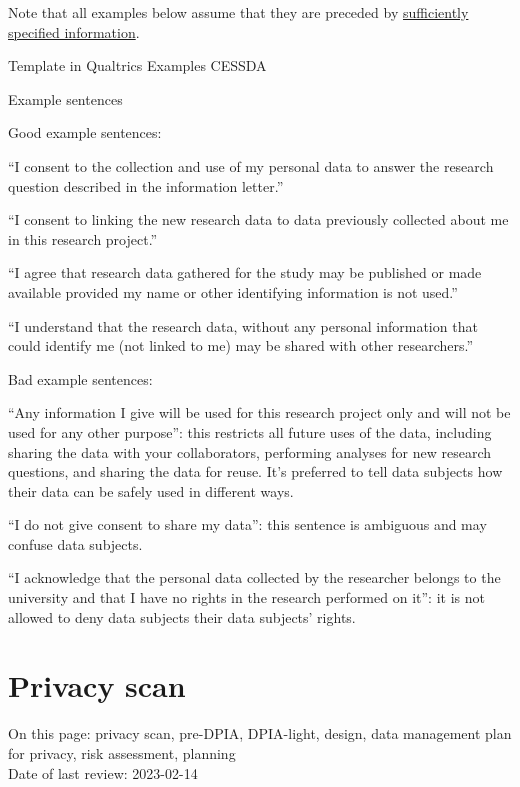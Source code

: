 \documentclass[
]{book}
\begin{document}
Note that all examples below assume that they are preceded by
\protect\hyperlink{privacy-notices}{sufficiently specified information}.

Template in Qualtrics
Examples CESSDA

Example sentences

Good example sentences:

``I consent to the collection and use of my personal data to answer the
research question described in the information letter.''

``I consent to linking the new research data to data previously collected
about me in this research project.''

``I agree that research data gathered for the study may be published or
made available provided my name or other identifying information is not used.''

``I understand that the research data, without any personal information
that could identify me (not linked to me) may be shared with other researchers.''

Bad example sentences:

``Any information I give will be used for this research project only and
will not be used for any other purpose'': this restricts all future uses of
the data, including sharing the data with your collaborators, performing
analyses for new research questions, and sharing the data for reuse. It's
preferred to tell data subjects how their data can be safely used in
different ways.

``I do not give consent to share my data'': this sentence is ambiguous and
may confuse data subjects.

``I acknowledge that the personal data collected by the researcher belongs
to the university and that I have no rights in the research performed on it'':
it is not allowed to deny data subjects their data subjects' rights.

\hypertarget{privacy-scan}{%
\section{Privacy scan}\label{privacy-scan}}

On this page: privacy scan, pre-DPIA, DPIA-light, design, data management plan
for privacy, risk assessment, planning\\
Date of last review: 2023-02-14
\end{document}
